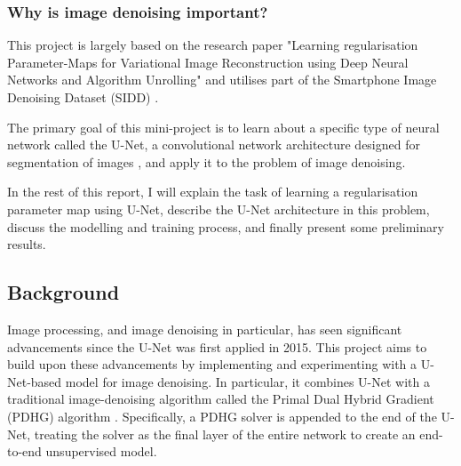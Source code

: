 \documentclass[12pt]{article}
\begin{document}
\subsubsection{Why is image denoising important?}


This project is largely based on the research paper "Learning regularisation Parameter-Maps for Variational Image Reconstruction using Deep Neural Networks and Algorithm Unrolling" \cite{kofler2023learning} and utilises part of the Smartphone Image Denoising Dataset (SIDD) \cite{SIDD_2018_CVPR}.

 

The primary goal of this mini-project is to learn about a specific type of neural network called the U-Net, a convolutional network architecture
designed for segmentation of images \cite{ronneberger2015unet}, and apply it to the problem of image denoising. 

In the rest of this report, I will explain the task of learning a regularisation parameter map using U-Net, describe the U-Net architecture in this problem, discuss the modelling and training process, and finally present some preliminary results. 



\subsection{Background}

Image processing, and image denoising in particular, has seen significant advancements since the U-Net was first applied in 2015. This project aims to build upon these advancements by implementing and experimenting with a U-Net-based model for image denoising.
In particular, it combines U-Net with a traditional image-denoising algorithm called the Primal Dual Hybrid Gradient (PDHG) algorithm \cite{kofler2023learning}.
Specifically, a PDHG solver is appended to the end of the U-Net, treating the solver as the final layer of the entire network to create an end-to-end unsupervised model.
\end{document}
